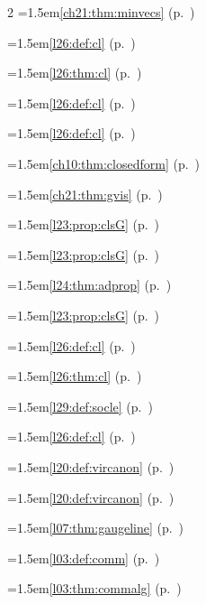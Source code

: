 \begin{multicols}{2}
\hangindent=1.5em\quad \ref{ch21:thm:minvecs} (p.~\pageref{ch21:thm:minvecs})\par
\hangindent=1.5em\quad \ref{l26:def:cl} (p.~\pageref{l26:def:cl})\par
\hangindent=1.5em\quad \ref{l26:thm:cl} (p.~\pageref{l26:thm:cl})\par
\hangindent=1.5em\quad \ref{l26:def:cl} (p.~\pageref{l26:def:cl})\par
\hangindent=1.5em\quad \ref{l26:def:cl} (p.~\pageref{l26:def:cl})\par
\hangindent=1.5em\quad \ref{ch10:thm:closedform} (p.~\pageref{ch10:thm:closedform})\par
\hangindent=1.5em\quad \ref{ch21:thm:gvis} (p.~\pageref{ch21:thm:gvis})\par
\hangindent=1.5em\quad \ref{l23:prop:clsG} (p.~\pageref{l23:prop:clsG})\par
\hangindent=1.5em\quad \ref{l23:prop:clsG} (p.~\pageref{l23:prop:clsG})\par
\hangindent=1.5em\quad \ref{l24:thm:adprop} (p.~\pageref{l24:thm:adprop})\par
\hangindent=1.5em\quad \ref{l23:prop:clsG} (p.~\pageref{l23:prop:clsG})\par
\hangindent=1.5em\quad \ref{l26:def:cl} (p.~\pageref{l26:def:cl})\par
\hangindent=1.5em\quad \ref{l26:thm:cl} (p.~\pageref{l26:thm:cl})\par
\hangindent=1.5em\quad \ref{l29:def:socle} (p.~\pageref{l29:def:socle})\par
\hangindent=1.5em\quad \ref{l26:def:cl} (p.~\pageref{l26:def:cl})\par
\hangindent=1.5em\quad \ref{l20:def:vircanon} (p.~\pageref{l20:def:vircanon})\par
\hangindent=1.5em\quad \ref{l20:def:vircanon} (p.~\pageref{l20:def:vircanon})\par
\hangindent=1.5em\quad \ref{l07:thm:gaugeline} (p.~\pageref{l07:thm:gaugeline})\par
\hangindent=1.5em\quad \ref{l03:def:comm} (p.~\pageref{l03:def:comm})\par
\hangindent=1.5em\quad \ref{l03:thm:commalg} (p.~\pageref{l03:thm:commalg})\par

\end{multicols}
